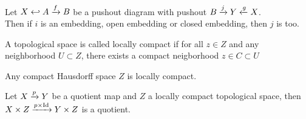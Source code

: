 \documentclass[../main.tex]{subfiles}
\begin{document}
\begin{lemma}
	Let $X \hookleftarrow A \xrightarrow{f} B$ be a pushout diagram with pushout $B \xrightarrow{j} Y \xleftarrow{g} X$.\\
Then if $ i$ is an embedding, open embedding or closed embedding, then $j$ is too.
\end{lemma}
\begin{defn}
	A topological space is called locally compact if for all $z\in Z$ and any neighborhood $U \subset Z$, there exists a compact neigborhood $z\in C \subset U$ 
\end{defn}
\begin{exemple}
Any compact Hausdorff space $Z$ is locally compact.
\end{exemple}
\begin{propo}
	Let $X\xrightarrow{p} Y$ be a quotient map and $Z$ a locally compact topological space, then $X\times Z \xrightarrow{p \times \operatorname{Id}} Y \times Z$ is a quotient.
\end{propo}
\end{document}

